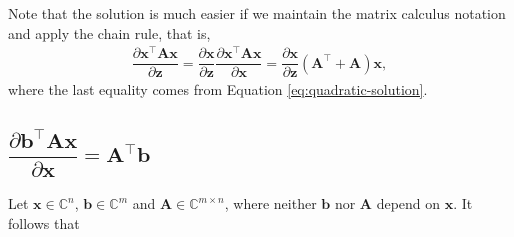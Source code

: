 \documentclass{article}
\newcommand{\trans}{\top}
\begin{document}
Note that the solution is much easier if we maintain the matrix calculus notation and apply the chain rule, that is,
\begin{align}
    \dfrac{\partial \mathbf{x}^\trans \mathbf{A} \mathbf{x}}{\partial \mathbf{z}} = \dfrac{\partial \mathbf{x}}{\partial \mathbf{z}} \dfrac{\partial \mathbf{x}^\trans \mathbf{A} \mathbf{x}}{\partial \mathbf{x}} = \dfrac{\partial \mathbf{x}}{\partial \mathbf{z}} \left(\mathbf{A}^\trans + \mathbf{A}\right) \mathbf{x},
\end{align}
where the last equality comes from Equation \eqref{eq:quadratic-solution}.

\subsection{\(\dfrac{\partial \mathbf{b}^\trans \mathbf{A} \mathbf{x}}{\partial \mathbf{x}} = \mathbf{A}^\trans \mathbf{b}\)} \label{sec:bt-A-x}
Let \(\mathbf{x} \in \mathbb{C}^{n}\), \(\mathbf{b} \in \mathbb{C}^{m}\) and \(\mathbf{A}\in \mathbb{C}^{m\times n}\), where neither \(\mathbf{b}\) nor \(\mathbf{A}\) depend on \(\mathbf{x}\). It follows that
\end{document}
